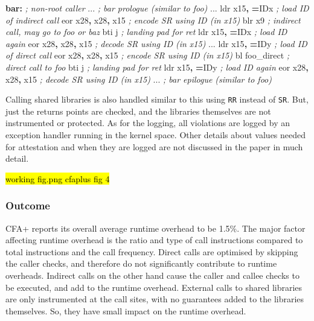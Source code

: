 \documentclass[a4paper, nobind]{templates/ociamthesis}
\newenvironment{Shaded}{\begin{snugshade}}{\end{snugshade}}
\newcommand{\CommentTok}[1]{\textcolor[rgb]{0.56,0.35,0.01}{\textit{#1}}}
\newcommand{\FunctionTok}[1]{\textcolor[rgb]{0.13,0.29,0.53}{\textbf{#1}}}
\newcommand{\NormalTok}[1]{#1}
\newcommand{\OperatorTok}[1]{\textcolor[rgb]{0.81,0.36,0.00}{\textbf{#1}}}
\renewenvironment{Shaded}
{
  \vspace{10pt}%
  \begin{snugshade}%
}{%
  \end{snugshade}%
  \vspace{8pt}%
}
\begin{document}
\begin{Shaded}
\begin{Highlighting}[]
\FunctionTok{bar:}                    \CommentTok{; non{-}root caller}
\NormalTok{  ...                   }\CommentTok{; bar prologue (similar to foo)}
\NormalTok{  ...}
\NormalTok{  ldr x15}\OperatorTok{,} \OperatorTok{=}\NormalTok{IDx         }\CommentTok{; load ID of indirect call}
\NormalTok{  eor x28}\OperatorTok{,}\NormalTok{ x28}\OperatorTok{,}\NormalTok{ x15     }\CommentTok{; encode SR using ID (in x15)}
\NormalTok{  blr x9                }\CommentTok{; indirect call, may go to foo or baz}
\NormalTok{  bti j                 }\CommentTok{; landing pad for ret}
\NormalTok{  ldr x15}\OperatorTok{,} \OperatorTok{=}\NormalTok{IDx         }\CommentTok{; load ID again}
\NormalTok{  eor x28}\OperatorTok{,}\NormalTok{ x28}\OperatorTok{,}\NormalTok{ x15     }\CommentTok{; decode SR using ID (in x15)}
\NormalTok{  ...}
\NormalTok{  ldr x15}\OperatorTok{,} \OperatorTok{=}\NormalTok{IDy         }\CommentTok{; load ID of direct call}
\NormalTok{  eor x28}\OperatorTok{,}\NormalTok{ x28}\OperatorTok{,}\NormalTok{ x15     }\CommentTok{; encode SR using ID (in x15)}
\NormalTok{  bl foo\_direct         }\CommentTok{; direct call to foo}
\NormalTok{  bti j                 }\CommentTok{; landing pad for ret}
\NormalTok{  ldr x15}\OperatorTok{,} \OperatorTok{=}\NormalTok{IDy         }\CommentTok{; load ID again}
\NormalTok{  eor x28}\OperatorTok{,}\NormalTok{ x28}\OperatorTok{,}\NormalTok{ x15     }\CommentTok{; decode SR using ID (in x15)}
\NormalTok{  ...                   }\CommentTok{; bar epilogue (similar to foo)}
\end{Highlighting}
\end{Shaded}

Calling shared libraries is also handled similar to this using \texttt{RR} instead of \texttt{SR}.
But, just the returns points are checked, and the libraries themselves are not
instrumented or protected. As for the logging, all violations are logged by an
exception handler running in the kernel space. Other details about values needed for
attestation and when they are logged are not discussed in the paper in much detail.

\hl{working fig.png cfaplus fig 4}

\subsubsection{Outcome}\label{outcome-1}

CFA+ reports its overall average runtime overhead to be 1.5\%.
The major factor affecting runtime overhead is the ratio and type of call instructions
compared to total instructions and the call frequency.
Direct calls are optimised by skipping the caller checks, and therefore do not
significantly contribute to runtime overheads. Indirect calls on the other hand
cause the caller and callee checks to be executed, and add to the runtime overhead.
External calls to shared libraries are only instrumented at the call sites, with
no guarantees added to the libraries themselves. So, they have small impact on
the runtime overhead.
\end{document}
